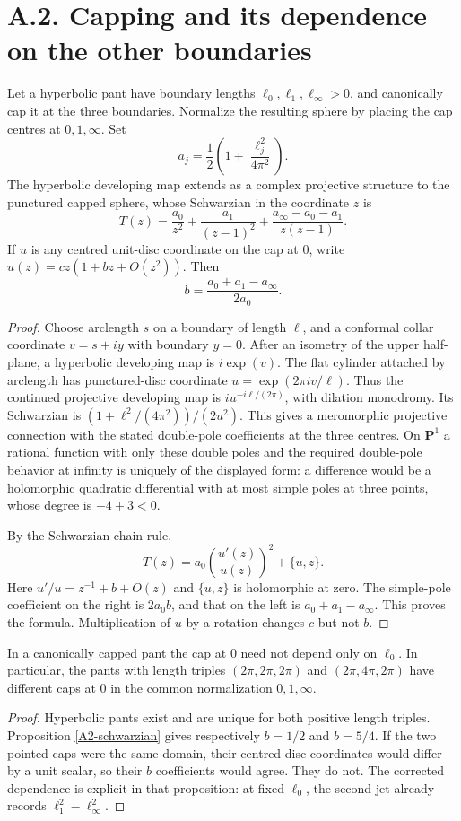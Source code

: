 \section{A.2. Capping and its dependence on the other boundaries}
\begin{proposition}\label{A2-schwarzian}
Let a hyperbolic pant have boundary lengths $\ell_0,\ell_1,\ell_\infty>0$, and canonically cap it at the three boundaries. Normalize the resulting sphere by placing the cap centres at $0,1,\infty$. Set
\[
a_j=\frac12\left(1+\frac{\ell_j^2}{4\pi^2}\right).
\]
The hyperbolic developing map extends as a complex projective structure to the punctured capped sphere, whose Schwarzian in the coordinate $z$ is
\[
T(z)=\frac{a_0}{z^2}+\frac{a_1}{(z-1)^2}
       +\frac{a_\infty-a_0-a_1}{z(z-1)}.
\]
If $u$ is any centred unit-disc coordinate on the cap at $0$, write $u(z)=c z(1+bz+O(z^2))$. Then
\[
b=\frac{a_0+a_1-a_\infty}{2a_0}.
\]
\end{proposition}
\begin{proof}
Choose arclength $s$ on a boundary of length $\ell$, and a conformal collar coordinate $v=s+iy$ with boundary $y=0$. After an isometry of the upper half-plane, a hyperbolic developing map is $i\exp(v)$. The flat cylinder attached by arclength has punctured-disc coordinate $u=\exp(2\pi i v/\ell)$. Thus the continued projective developing map is $i u^{-i\ell/(2\pi)}$, with dilation monodromy. Its Schwarzian is $(1+\ell^2/(4\pi^2))/(2u^2)$. This gives a meromorphic projective connection with the stated double-pole coefficients at the three centres. On $\mathbf P^1$ a rational function with only these double poles and the required double-pole behavior at infinity is uniquely of the displayed form: a difference would be a holomorphic quadratic differential with at most simple poles at three points, whose degree is $-4+3<0$.

By the Schwarzian chain rule,
\[
T(z)=a_0\left(\frac{u'(z)}{u(z)}\right)^2+\{u,z\}.
\]
Here $u'/u=z^{-1}+b+O(z)$ and $\{u,z\}$ is holomorphic at zero. The simple-pole coefficient on the right is $2a_0b$, and that on the left is $a_0+a_1-a_\infty$. This proves the formula. Multiplication of $u$ by a rotation changes $c$ but not $b$.
\end{proof}

\begin{theorem}\label{A2-independence}
In a canonically capped pant the cap at $0$ need not depend only on $\ell_0$. In particular, the pants with length triples $(2\pi,2\pi,2\pi)$ and $(2\pi,4\pi,2\pi)$ have different caps at $0$ in the common normalization $0,1,\infty$.
\end{theorem}
\begin{proof}
Hyperbolic pants exist and are unique for both positive length triples. Proposition \ref{A2-schwarzian} gives respectively $b=1/2$ and $b=5/4$. If the two pointed caps were the same domain, their centred disc coordinates would differ by a unit scalar, so their $b$ coefficients would agree. They do not. The corrected dependence is explicit in that proposition: at fixed $\ell_0$, the second jet already records $\ell_1^2-\ell_\infty^2$.
\end{proof}

